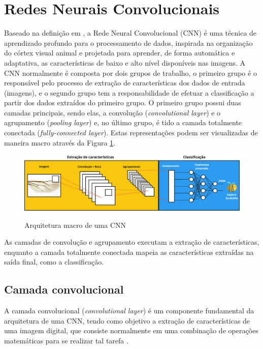 \documentclass[
	12pt,				%
	oneside,			%
	a4paper,			%
	english,			%
	brazil				%
	]{abntex2ppgsi}
\begin{document}
\section{Redes Neurais Convolucionais}
Baseado na definição em , a Rede Neural Convolucional (CNN) é uma técnica de aprendizado profundo para o processamento de dados, inspirada na organização do córtex visual animal e projetada para aprender, de forma automática e adaptativa, as características de baixo e alto nível disponíveis nas imagens. A CNN normalmente é composta por dois grupos de trabalho, o primeiro grupo é o responsável pelo processo de extração de características dos dados de entrada (imagens), e o segundo grupo tem a responsabilidade de efetuar a classificação a partir dos dados extraídos do primeiro grupo. O primeiro grupo possui duas camadas principais, sendo elas, a convolução (\textit{convolutional layer}) e o agrupamento (\textit{pooling layer}) e, no último grupo, é tido a camada totalmente conectada (\textit{fully-connected layer}). Estas representações podem ser visualizadas de maneira macro através da Figura \ref{fig:arquitetura_macro_cnn}.

\begin{figure}[H]
    \centering
    \caption{Arquitetura macro de uma CNN}
    \includegraphics[width=1.0\textwidth]{imagens/conceitos_basicos/arquitetura_cnn.jpg}
    \label{fig:arquitetura_macro_cnn}
\end{figure}

As camadas de convolução e agrupamento executam a extração de características, enquanto a camada totalmente conectada mapeia as características extraídas na saída final, como a classificação.

\subsection{Camada convolucional}
A camada convolucional (\textit{convolutional layer}) é um componente fundamental da arquitetura de uma CNN, tendo como objetivo a extração de características de uma imagem digital, que consiste normalmente em uma combinação de operações matemáticas para se realizar tal tarefa \cite{yamashita2018convolutional}.
\end{document}

